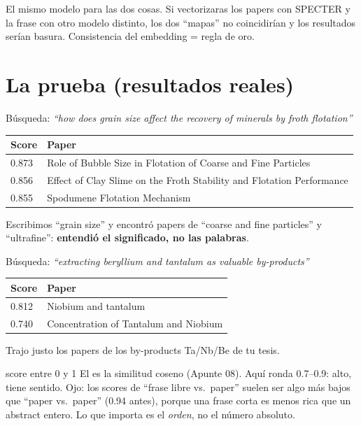 \documentclass[11pt,a4paper]{article}
\begin{document}
\begin{ojo}
El mismo modelo para las dos cosas. Si vectorizaras los papers con SPECTER y la frase con
otro modelo distinto, los dos ``mapas'' no coincidirían y los resultados serían basura.
Consistencia del embedding = regla de oro.
\end{ojo}

\section{La prueba (resultados reales)}

Búsqueda: \emph{``how does grain size affect the recovery of minerals by froth flotation''}
\begin{center}
\begin{tabular}{ll}
\textbf{Score} & \textbf{Paper} \\
\hline
0.873 & Role of Bubble Size in Flotation of Coarse and Fine Particles \\
0.856 & Effect of Clay Slime on the Froth Stability and Flotation Performance \\
0.855 & Spodumene Flotation Mechanism \\
\end{tabular}
\end{center}
Escribimos ``grain size'' y encontró papers de ``coarse and fine particles'' y ``ultrafine'':
\textbf{entendió el significado, no las palabras}.

Búsqueda: \emph{``extracting beryllium and tantalum as valuable by-products''}
\begin{center}
\begin{tabular}{ll}
\textbf{Score} & \textbf{Paper} \\
\hline
0.812 & Niobium and tantalum \\
0.740 & Concentration of Tantalum and Niobium \\
\end{tabular}
\end{center}
Trajo justo los papers de los by-products Ta/Nb/Be de tu tesis.

\begin{concepto}{score entre 0 y 1}
El  es la similitud coseno (Apunte 08). Aquí ronda 0.7--0.9: alto, tiene
sentido. Ojo: los scores de ``frase libre vs.\ paper'' suelen ser algo más bajos que
``paper vs.\ paper'' (0.94 antes), porque una frase corta es menos rica que un abstract
entero. Lo que importa es el \emph{orden}, no el número absoluto.
\end{concepto}
\end{document}
